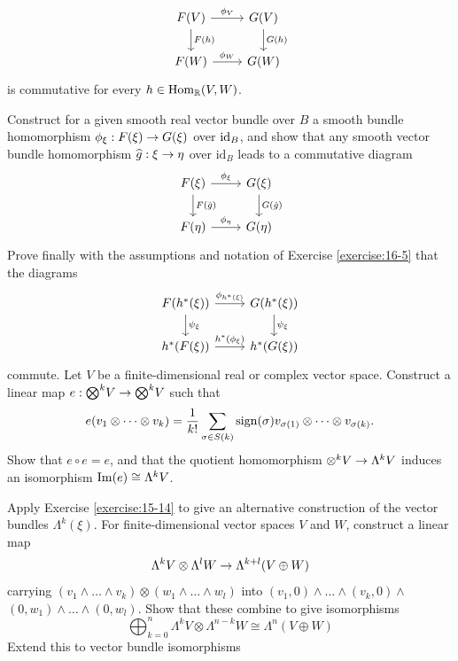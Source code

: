 \begin{enumerate}[\theexercise.1]
\[\begin{tikzcd}
      F(V)\dar{F(h)}\rar{\phi_V} & G(V)\dar{G(h)} \\
      F(W) \rar{\phi_W} & G(W)
    \end{tikzcd}\]
    is commutative for every $h \in  {\ensuremath{\mathrm{Hom}}}_{{\mathbb{R}}}( {V,W})$.\par
    Construct for a given smooth real vector bundle over $B$ a smooth bundle homomorphism ${\phi }_{\xi } : F( \xi )  \rightarrow  G( \xi )$ over ${\mathrm{id}}_{B}$, and show that any smooth vector bundle homomorphism $\widehat{g} : \xi  \rightarrow  \eta$ over ${\mathrm{{id}}}_{B}$ leads to a commutative diagram
    \[\begin{tikzcd}
      F(\xi)\dar{F(\hat g)}\rar{\phi_\xi} & G(\xi)\dar{G(\hat g)} \\
      F(\eta) \rar{\phi_\eta} & G(\eta)
    \end{tikzcd}\]
    Prove finally with the assumptions and notation of Exercise \ref{exercise:16-5} that the diagrams
    \[\begin{tikzcd}
      F( {{h}^*( \xi ) }) \dar{{\psi }_{\xi }}\rar{{\phi }_{{h}^*( \xi ) }} & G( {{h}^*( \xi ) })\dar{{\psi }_{\xi }}\\
      {h}^*( {F( \xi ) }) \rar{{h}^*( {\phi }_{\xi }) } & {h}^*( {G( \xi ) })
    \end{tikzcd}\]
    commute.
  \NewItem Let $V$ be a finite-dimensional real or complex vector space. Construct a linear map $e : {\bigotimes }^{k}V \rightarrow  {\bigotimes }^{k}V$ such that
    \[
      e( {{v}_{1} \otimes  \cdots  \otimes  {v}_{k}})  = \frac{1}{k!}\sum_{{\sigma  \in  S( k) }}\mathrm{sign}( \sigma ) {v}_{\sigma ( 1) } \otimes  \cdots  \otimes  {v}_{\sigma ( k) }.
    \]
    Show that $e \circ  e = e$, and that the quotient homomorphism ${ \otimes  }^{k}V \rightarrow  {\Lambda }^{k}V$ induces an isomorphism $\operatorname{Im}( e)  \cong  {\Lambda }^{k}V$.\par
    Apply Exercise \ref{exercise:15-14} to give an alternative construction of the vector bundles ${\Lambda }^{k}( \xi )$.
  \NewItem For finite-dimensional vector spaces $V$ and $W$, construct a linear map
    \[
      {\Lambda }^{k}V \otimes  {\Lambda }^{l}W \rightarrow  {\Lambda }^{k + l}( {V \oplus  W})
    \]
    carrying $( {{v}_{1} \land  \ldots  \land  {v}_{k}})  \otimes  ( {{w}_{1} \land  \ldots  \land  {w}_{l}})$ into $( {{v}_{1},0})  \land  \ldots  \land  ( {{v}_{k},0})  \land$  $( {0,{w}_{1}})  \land  \ldots  \land  ( {0,{w}_{l}})$. Show that these combine to give isomorphisms
    \[
      \bigoplus_{k = 0}^n{\Lambda }^{k}V \otimes  {\Lambda }^{n- k}W \cong  {\Lambda }^{n}( {V \oplus  W})
    \]
    Extend this to vector bundle isomorphisms

\end{enumerate}
